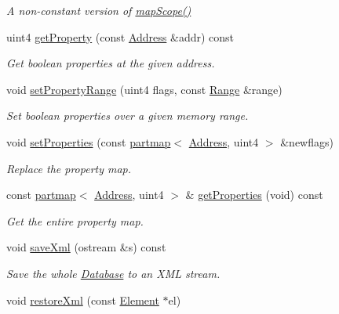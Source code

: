 \begin{DoxyCompactItemize}
\begin{DoxyCompactList}\small\item\em A non-\/constant version of \mbox{\hyperlink{class_database_ab3840564f424238dd3a498fdb1a02644}{map\+Scope()}} \end{DoxyCompactList}\item 
uint4 \mbox{\hyperlink{class_database_a1337718ffa932cf80a4d0d27e9998a06}{get\+Property}} (const \mbox{\hyperlink{class_address}{Address}} \&addr) const
\begin{DoxyCompactList}\small\item\em Get boolean properties at the given address. \end{DoxyCompactList}\item 
void \mbox{\hyperlink{class_database_aca0311269bfa73f5673c998dec92bb95}{set\+Property\+Range}} (uint4 flags, const \mbox{\hyperlink{class_range}{Range}} \&range)
\begin{DoxyCompactList}\small\item\em Set boolean properties over a given memory range. \end{DoxyCompactList}\item 
void \mbox{\hyperlink{class_database_a24a13d8036c39ae06909cb698529695f}{set\+Properties}} (const \mbox{\hyperlink{classpartmap}{partmap}}$<$ \mbox{\hyperlink{class_address}{Address}}, uint4 $>$ \&newflags)
\begin{DoxyCompactList}\small\item\em Replace the property map. \end{DoxyCompactList}\item 
const \mbox{\hyperlink{classpartmap}{partmap}}$<$ \mbox{\hyperlink{class_address}{Address}}, uint4 $>$ \& \mbox{\hyperlink{class_database_a56bb739490aaee87bb1cb2849bfdfb53}{get\+Properties}} (void) const
\begin{DoxyCompactList}\small\item\em Get the entire property map. \end{DoxyCompactList}\item 
void \mbox{\hyperlink{class_database_ae44b2d77910ea8fd574443e5d7da55e9}{save\+Xml}} (ostream \&s) const
\begin{DoxyCompactList}\small\item\em Save the whole \mbox{\hyperlink{class_database}{Database}} to an X\+ML stream. \end{DoxyCompactList}\item 
void \mbox{\hyperlink{class_database_ad216578696aaa7c956be9cfe752edf57}{restore\+Xml}} (const \mbox{\hyperlink{class_element}{Element}} $\ast$el)

\end{DoxyCompactItemize}
